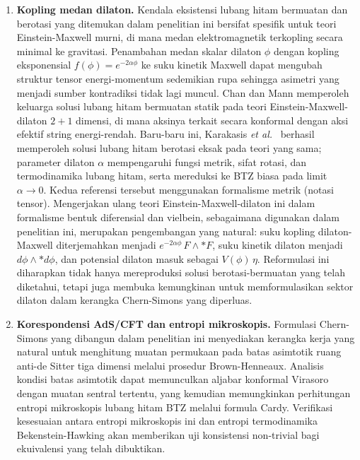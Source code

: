 \begin{enumerate}[label=\textbf{\arabic*.}, leftmargin=*, itemsep=6pt]
    \item \textbf{Kopling medan dilaton.} Kendala eksistensi lubang hitam bermuatan dan berotasi yang ditemukan dalam penelitian ini bersifat spesifik untuk teori Einstein-Maxwell murni, di mana medan elektromagnetik terkopling secara minimal ke gravitasi. Penambahan medan skalar dilaton $\phi$ dengan kopling eksponensial $f(\phi) = e^{-2\alpha\phi}$ ke suku kinetik Maxwell dapat mengubah struktur tensor energi-momentum sedemikian rupa sehingga asimetri yang menjadi sumber kontradiksi tidak lagi muncul. Chan dan Mann \cite{chan1994} memperoleh keluarga solusi lubang hitam bermuatan statik pada teori Einstein-Maxwell-dilaton $2+1$ dimensi, di mana aksinya terkait secara konformal dengan aksi efektif string energi-rendah. Baru-baru ini, Karakasis \textit{et al.}\ \cite{karakasis2023} berhasil memperoleh solusi lubang hitam berotasi eksak pada teori yang sama; parameter dilaton $\alpha$ mempengaruhi fungsi metrik, sifat rotasi, dan termodinamika lubang hitam, serta mereduksi ke BTZ biasa pada limit $\alpha \to 0$. Kedua referensi tersebut menggunakan formalisme metrik (notasi tensor). Mengerjakan ulang teori Einstein-Maxwell-dilaton ini dalam formalisme bentuk diferensial dan vielbein, sebagaimana digunakan dalam penelitian ini, merupakan pengembangan yang natural: suku kopling dilaton-Maxwell diterjemahkan menjadi $e^{-2\alpha\phi}\, F \wedge {*}F$, suku kinetik dilaton menjadi $d\phi \wedge {*}d\phi$, dan potensial dilaton masuk sebagai $V(\phi)\,\eta$. Reformulasi ini diharapkan tidak hanya mereproduksi solusi berotasi-bermuatan yang telah diketahui, tetapi juga membuka kemungkinan untuk memformulasikan sektor dilaton dalam kerangka Chern-Simons yang diperluas.

    \item \textbf{Korespondensi AdS/CFT dan entropi mikroskopis.} Formulasi Chern-Simons yang dibangun dalam penelitian ini menyediakan kerangka kerja yang natural untuk menghitung muatan permukaan pada batas asimtotik ruang anti-de Sitter tiga dimensi melalui prosedur Brown-Henneaux. Analisis kondisi batas asimtotik dapat memunculkan aljabar konformal Virasoro dengan muatan sentral tertentu, yang kemudian memungkinkan perhitungan entropi mikroskopis lubang hitam BTZ melalui formula Cardy. Verifikasi kesesuaian antara entropi mikroskopis ini dan entropi termodinamika Bekenstein-Hawking akan memberikan uji konsistensi non-trivial bagi ekuivalensi yang telah dibuktikan.
\end{enumerate}